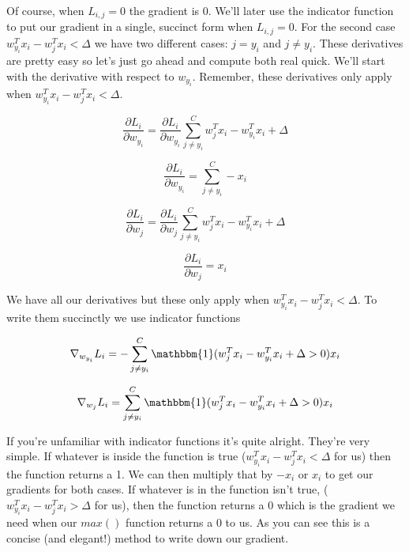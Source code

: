 \documentclass[12pt]{article}
\begin{document}
Of course, when $L_{i, j} = 0$ the gradient is 0. We'll later use the indicator function
to put our gradient in a single, succinct form when $L_{i, j} = 0$. For the second case 
$w_{y_i}^T x_i - w_j^T x_i < \Delta$ we have two different cases: $j = y_i$ and $j \neq y_i$. 
These derivatives are pretty easy so let's just go ahead and compute both real quick.
We'll start with the derivative with respect to $w_{y_i}$. Remember, these 
derivatives only apply when $w_{y_i}^T x_i - w_j^T x_i < \Delta$.

\begin{equation}
    \frac{\partial L_i}{\partial w_{y_i}} = \frac{\partial L_i}{\partial w_{y_i}}
    \sum_{j \neq y_i}^C w_j^T x_i - w_{y_i}^T x_i + \Delta
\end{equation}

\begin{equation}
    \frac{\partial L_i}{\partial w_{y_i}} = \sum_{j \neq y_i}^C -x_i
\end{equation}

\begin{equation}
    \frac{\partial L_i}{\partial w_j} = \frac{\partial L_i}{\partial w_j}
    \sum_{j \neq y_i}^C w_j^T x_i - w_{y_i}^T x_i + \Delta
\end{equation}

\begin{equation}
    \frac{\partial L_i}{\partial w_j} = x_i
\end{equation}

\noindent We have all our derivatives but these only apply when 
$w_{y_i}^T x_i - w_j^T x_i < \Delta$. To write them succinctly we use indicator functions

\begin{equation}
    \nabla_{w_{y_i}} L_i = -\sum_{j \neq y_i}^C \mathbbm{1}
        (w_j^T x_i - w_{y_i}^T x_i + \Delta > 0)x_i
\end{equation}

\begin{equation}
    \nabla_{w_j} L_i = \sum_{j \neq y_i}^C \mathbbm{1}
        (w_j^T x_i - w_{y_i}^T x_i + \Delta > 0)x_i
\end{equation}

\noindent If you're unfamiliar with indicator functions it's quite alright. They're very simple. 
If whatever is inside the function is true ($w_{y_i}^T x_i - w_j^T x_i < \Delta$ for us) 
then the function returns a 1. We can then multiply that by $-x_i$ or $x_i$ to get our 
gradients for both cases. If whatever is in the function isn't true, 
($w_{y_i}^T x_i - w_j^T x_i > \Delta$ for us), then the function returns a 0 which is 
the gradient we need when our $max()$ function returns a 0 to us. As you can see this 
is a concise (and elegant!) method to write down our gradient.
\end{document}

